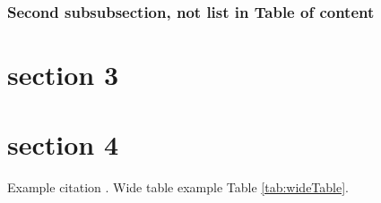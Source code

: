 \documentclass[]{uiophd}
\begin{document}
\subsubsection*{Second subsubsection, not list in Table of content}

\section{section 3}
\lipsum[5] %

\section{section 4}
\lipsum[6] %
Example citation \cite{bartel2018metazoan}. \cite{Levenshtein1966}
Wide table example Table \ref{tab:wideTable}.
\end{document}
